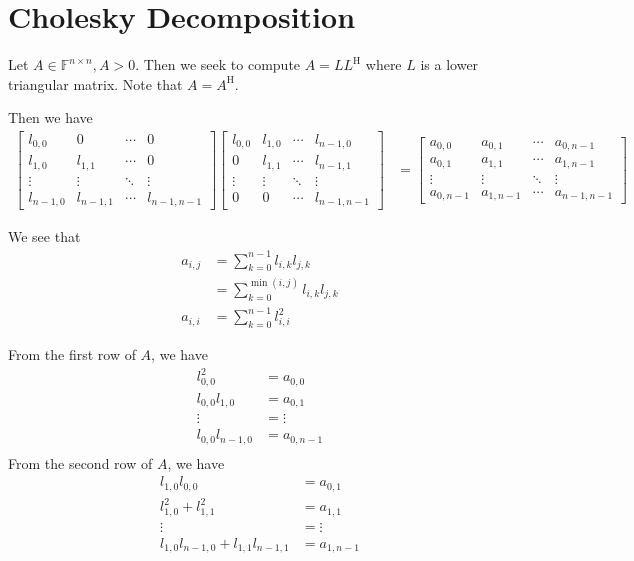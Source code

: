\documentclass{article}
\begin{document}
\section{Cholesky Decomposition}
Let $A \in \mathbb{F}^{n \times n}, A > 0$.
Then we seek to compute $A = LL^\mathrm{H}$ where $L$ is a lower triangular matrix. Note that $A = A^\mathrm{H}$.

Then we have
\begin{align*}
    \begin{bmatrix}
        l_{0,0} & 0 & \cdots & 0 \\
        l_{1,0} & l_{1,1} & \cdots & 0 \\
        \vdots & \vdots & \ddots & \vdots \\
        l_{n-1,0} & l_{n-1,1} & \cdots & l_{n-1,n-1}
    \end{bmatrix} \begin{bmatrix}
        l_{0,0} & l_{1,0} & \cdots & l_{n-1,0} \\
        0 & l_{1,1} & \cdots & l_{n-1,1} \\
        \vdots & \vdots & \ddots & \vdots \\
        0 & 0 & \cdots & l_{n-1,n-1}
    \end{bmatrix} &= \begin{bmatrix}
        a_{0,0} & a_{0,1} & \cdots & a_{0,n-1} \\
        a_{0,1} & a_{1,1} & \cdots & a_{1,n-1} \\
        \vdots & \vdots & \ddots & \vdots \\
        a_{0,n-1} & a_{1,n-1} & \cdots & a_{n-1,n-1}
    \end{bmatrix}
\end{align*}

We see that
\begin{align*}
    a_{i,j} &= \sum_{k=0}^{n-1} l_{i,k} l_{j,k} \\
    &= \sum_{k=0}^{\min(i,j)} l_{i,k} l_{j,k} \\
    a_{i,i} &= \sum_{k=0}^{n-1} l_{i,i}^2
\end{align*}

From the first row of $A$, we have
\begin{align*}
    l_{0,0}^2 &= a_{0,0} \\
    l_{0,0} l_{1,0} &= a_{0,1} \\
    \vdots &= \vdots \\
    l_{0,0} l_{n-1,0} &= a_{0,n-1} \\
\end{align*}
From the second row of $A$, we have
\begin{align*}
    l_{1,0} l_{0,0} &= a_{0,1} \\
    l_{1,0}^2 + l_{1,1}^2 &= a_{1,1} \\
    \vdots &= \vdots \\
    l_{1,0} l_{n-1,0} + l_{1,1} l_{n-1,1} &= a_{1,n-1} \\
\end{align*}
\end{document}

